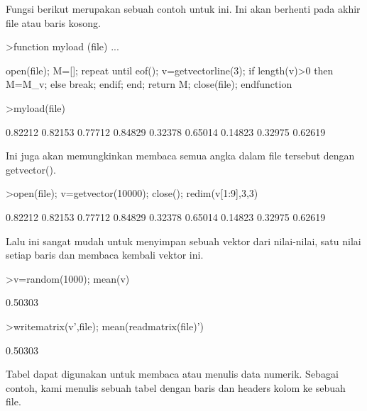 \documentclass[a4paper,10pt]{article}
\begin{document}
\begin{eulernotebook}
\begin{eulercomment}
\begin{eulercomment}
\begin{eulercomment}
\begin{eulercomment}
\begin{eulercomment}
\begin{eulercomment}
\begin{eulercomment}
Fungsi berikut merupakan sebuah contoh untuk  ini. Ini akan berhenti
pada akhir file atau baris kosong.
\end{eulercomment}
\begin{eulerprompt}
>function myload (file) ...
\end{eulerprompt}
\begin{eulerudf}
  open(file);
  M=[];
  repeat
     until eof();
     v=getvectorline(3);
     if length(v)>0 then M=M_v; else break; endif;
  end;
  return M;
  close(file);
  endfunction
\end{eulerudf}
\begin{eulerprompt}
>myload(file)
\end{eulerprompt}
\begin{euleroutput}
    0.82212   0.82153   0.77712 
    0.84829   0.32378   0.65014 
    0.14823   0.32975   0.62619 
\end{euleroutput}
\begin{eulercomment}
Ini juga akan memungkinkan membaca semua angka dalam file tersebut
dengan getvector().
\end{eulercomment}
\begin{eulerprompt}
>open(file); v=getvector(10000); close(); redim(v[1:9],3,3)
\end{eulerprompt}
\begin{euleroutput}
    0.82212   0.82153   0.77712 
    0.84829   0.32378   0.65014 
    0.14823   0.32975   0.62619 
\end{euleroutput}
\begin{eulercomment}
Lalu ini sangat mudah untuk menyimpan sebuah vektor dari nilai-nilai,
satu nilai setiap baris dan membaca kembali vektor ini.
\end{eulercomment}
\begin{eulerprompt}
>v=random(1000); mean(v)
\end{eulerprompt}
\begin{euleroutput}
  0.50303
\end{euleroutput}
\begin{eulerprompt}
>writematrix(v',file); mean(readmatrix(file)')
\end{eulerprompt}
\begin{euleroutput}
  0.50303
\end{euleroutput}
\begin{eulercomment}
Tabel dapat digunakan untuk membaca atau menulis data numerik. Sebagai
contoh, kami menulis sebuah tabel dengan baris dan headers kolom ke
sebuah file.

\end{eulercomment}
\end{eulercomment}
\end{eulercomment}
\end{eulercomment}
\end{eulercomment}
\end{eulercomment}
\end{eulercomment}
\end{eulernotebook}
\end{document}
